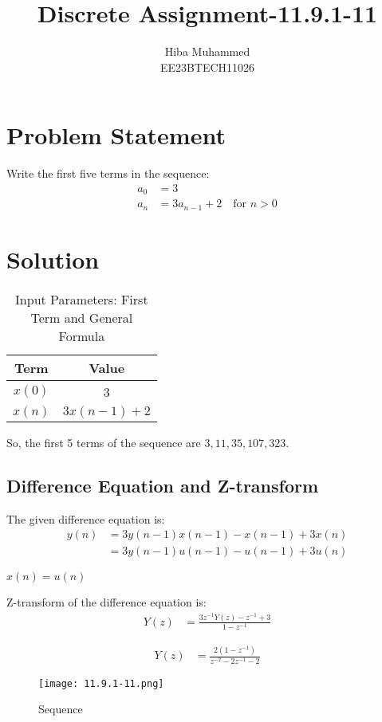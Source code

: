 \documentclass[12pt]{article}
\title{Discrete Assignment-11.9.1-11}
\author{Hiba Muhammed \\
        EE23BTECH11026}
\date{}
\begin{document}
\maketitle

\section*{Problem Statement}
Write the first five terms in the sequence:
\begin{align}
a_{0}  &= 3 \\
a_{n}  &= 3a_{n-1} + 2 \quad \text{for } n > 0
\end{align}

\section*{Solution}
\begin{table}[h]
  \centering
  \caption{Input Parameters: First Term and General Formula}
  \begin{tabular}{|c|c|}
    \hline
    \textbf{Term} & \textbf{Value} \\
    \hline
    \(x(0)\) & 3 \\
    \(x(n)\) & \(3x(n-1) + 2\) \\
    \hline
  \end{tabular}
\end{table}


So, the first 5 terms of the sequence are \(3, 11, 35, 107, 323\).

\subsection*{Difference Equation and Z-transform}

The given difference equation is:
\begin{align}
y(n) &= 3y(n-1)x(n-1) - x(n-1) + 3x(n) \\
     &= 3y(n-1)u(n-1) - u(n-1) + 3u(n)
\end{align}

\textbf{$x(n) = u(n)$}

Z-transform of the difference equation is:
\begin{align}
Y(z) &= \frac{3z^{-1}Y(z) - z^{-1} + 3}{1 - z^{-1}}
\end{align}

\begin{align}
Y(z) &= \frac{2(1 - z^{-1})}{z^{-2} - 2z^{-1} - 2}
\end{align}

\begin{figure}[h]
    \centering
    \texttt{[image: 11.9.1-11.png]}
    \caption{Sequence}
    \label{fig:comparison}
\end{figure}
\end{document}
